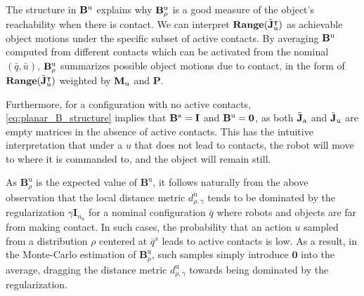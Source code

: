 \begin{example}

The structure in $\mathbf{B}^\mathrm{u}$ explains why $\mathbf{B}^\mathrm{u}_\rho$ is a good measure of the object's reachability when there is contact.
We can interpret $\mathbf{Range}(\tilde{\mathbf{J}}_\mathrm{u}^\intercal)$ as achievable object motions under the specific subset of active contacts.
By averaging $\mathbf{B}^\mathrm{u}$ computed from different contacts which can be activated from the nominal $(\bar{q}, \bar{u})$, $\mathbf{B}^\mathrm{u}_\rho$ summarizes possible object motions due to contact, in the form of $\mathbf{Range}(\tilde{\mathbf{J}}_\mathrm{u}^\intercal)$ weighted by $\mathbf{M}_\mathrm{u}$ and $\mathbf{P}$. 

Furthermore, for a configuration with no active contacts, \eqref{eq:planar_B_structure} implies that $\mathbf{B}^\mathrm{a} = \mathbf{I}$ and $\mathbf{B}^\mathrm{u} = \mathbf{0}$, as both $\tilde{\mathbf{J}}_\mathrm{a}$ and $\tilde{\mathbf{J}}_\mathrm{u}$ are empty matrices in the absence of active contacts. This has the intuitive interpretation that under a $u$ that does not lead to contacts, the robot will move to where it is commanded to, and the object will remain still.

As $\mathbf{B}_\rho^\mathrm{u}$ is the expected value of $\mathbf{B}^\mathrm{u}$, it follows naturally from the above observation that the local distance metric $d_{\rho, \gamma}^\mathrm{u}$ tends to be dominated by the regularization $\gamma \mathbf{I}_{n_\mathrm{u}}$ for a nominal configuration $\bar{q}$ where robots and objects are far from making contact. In such cases, the probability that an action $u$ sampled from a distribution $\rho$ centered at $\bar{q}^\mathrm{a}$ leads to active contacts is low. As a result, in the Monte-Carlo estimation of $\mathbf{B}_\rho^\mathrm{u}$, such samples simply introduce $\mathbf{0}$ into the average, dragging the distance metric $d^\mathrm{u}_{\rho,\gamma}$ towards being dominated by the regularization.
\end{example}



